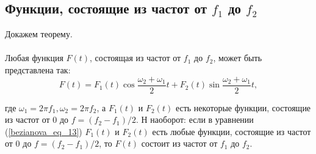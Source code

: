 \subsection*{Функции, состоящие из частот от $f_1$ до $f_2$} 

\qquad Докажем теорему.
\paragraph{}

\begin{theorem}\label{bezianova_theor_4} Любая функция $F(t)$, состоящая из частот от $f_1$ до $f_2$, может быть представлена так:
\begin{equation}\label{bezianova_eq_13}
	    F(t)=F_1(t) \cos \frac{\omega_2+\omega_1}{2} t+F_2(t) \sin \frac{\omega_2+\omega_1}{2} t,
\end{equation}

где $\omega_1=2 \pi f_1, \omega_2=2 \pi f_2$, а $F_1(t)$ и $F_2(t)$ есть некоторые функции, состоящие из частот от 0 до $f=\left(f_2-f_1\right) / 2$. Н наоборот: если в уравнении (\ref{bezianova_eq_13}) $F_1(t)$ и $F_2(t)$ есть любые функции, состоящие из частот от 0 до $f=\left(f_2-f_1\right) / 2$, то $F(t)$ состоит из частот от $f_1$ до $f_2$.
\end{theorem}

